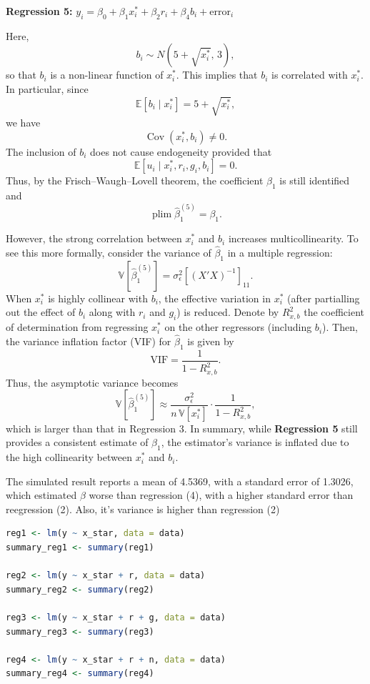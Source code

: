 \documentclass[a4paper,12pt]{article} %
\theoremstyle{nonitalic}
\newenvironment{solution}[1]
  {\renewcommand\theinnercustomsol{#1}\innercustomsol}
  {\endinnercustomsol}
\newcounter{solutionctr}
\renewcommand{\thesolutionctr}{(\alph{solutionctr})}
\newenvironment{autosolution}
  {\stepcounter{solutionctr}\begin{solution}{\thesolutionctr}}
  {\end{solution}}
\begin{document}
\begin{autosolution}
\textbf{Regression 5:} $y_i = \beta_0 + \beta_1 x^*_i + \beta_2 r_i + \beta_4 b_i + \text{error}_i$

Here,
\[
b_i \sim N\left(5+\sqrt{x_i^*},\,3\right),
\]
so that $b_i$ is a non-linear function of $x_i^*$. 
This implies that $b_i$ is correlated with $x_i^*$. 
In particular, since
\[
\mathbb{E}[b_i\mid x_i^*] = 5 + \sqrt{x_i^*},
\]
we have
\[
\operatorname{Cov}(x_i^*, b_i) \neq 0.
\]
The inclusion of $b_i$ does not cause endogeneity provided that 
\[
\mathbb{E}[u_i \mid x_i^*, r_i, g_i, b_i] = 0.
\]
Thus, by the Frisch--Waugh--Lovell theorem, 
the coefficient $\beta_1$ is still identified and
\[
\operatorname*{plim}\hat{\beta}_1^{(5)} = \beta_1.
\]

However, the strong correlation between $x_i^*$ and $b_i$ increases multicollinearity. 
To see this more formally, consider the variance of $\hat{\beta}_1$ in a multiple regression:
\[
\mathbb{V}[\hat{\beta}_1^{(5)}] = \sigma_{\epsilon}^2 \left[(X'X)^{-1}\right]_{11}.
\]
When $x_i^*$ is highly collinear with $b_i$, 
the effective variation in $x_i^*$ 
(after partialling out the effect of $b_i$ along with $r_i$ and $g_i$) 
is reduced. 
Denote by $R^2_{x,b}$ the coefficient of determination from 
regressing $x_i^*$ on the other regressors (including $b_i$). 
Then, the variance inflation factor (VIF) for $\hat{\beta}_1$ is given by
\[
\text{VIF} = \frac{1}{1-R^2_{x,b}}.
\]
Thus, the asymptotic variance becomes
\[
\mathbb{V}[\hat{\beta}_1^{(5)}] \approx \frac{\sigma_{\epsilon}^2}{n\,\mathbb{V}[x_i^*]}\cdot \frac{1}{1-R^2_{x,b}},
\]
which is larger than that in Regression 3. 
In summary, while \textbf{Regression 5} still provides a consistent estimate of $\beta_1$, 
the estimator's variance is inflated due to the high collinearity between $x_i^*$ and $b_i$.

The simulated result reports a mean of 4.5369, with a standard error of 1.3026, which estimated $\beta$ worse than regression (4), with a higher standard error than reegression (2).
Also, it's variance is higher than regression (2)

\begin{lstlisting}[language=R]
reg1 <- lm(y ~ x_star, data = data)
summary_reg1 <- summary(reg1)

reg2 <- lm(y ~ x_star + r, data = data)
summary_reg2 <- summary(reg2)

reg3 <- lm(y ~ x_star + r + g, data = data)
summary_reg3 <- summary(reg3)

reg4 <- lm(y ~ x_star + r + n, data = data)
summary_reg4 <- summary(reg4)


\end{lstlisting}
\end{autosolution}
\end{document}
